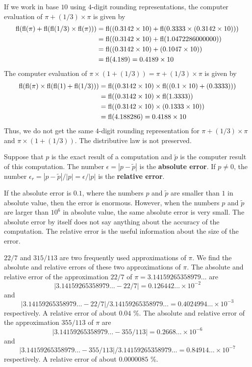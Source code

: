 \begin{itemize}
If we work in base $10$ using $4$-digit rounding representations, the
computer evaluation of $\pi + (1/3) \times \pi$ is given by
\begin{align*}
\operatorname{fl}(\operatorname{fl}(\pi)+\operatorname{fl}(\operatorname{fl}(1/3) \times \operatorname{fl}(\pi)))
&= \operatorname{fl}( (0.3142\times 10) + \operatorname{fl}( 0.3333 \times (0.3142 \times 10) )) \\
&= \operatorname{fl}( (0.3142\times 10) + \operatorname{fl}( 1.0472286000000  )) \\
&= \operatorname{fl}( (0.3142\times 10) + (0.1047 \times 10) ) \\
&= \operatorname{fl}( 4.189 ) = 0.4189 \times 10
\end{align*}
The computer evaluation of
$\pi \times (1 + (1/3))= \pi + (1/3)\times \pi$ is given by 
\begin{align*}
\operatorname{fl}( \operatorname{fl}(\pi) \times \operatorname{fl}( \operatorname{fl}(1) + \operatorname{fl}(1/3)))
&= \operatorname{fl}( (0.3142\times 10) \times \operatorname{fl}( (0.1\times 10) + (0.3333) )) \\
&= \operatorname{fl}( (0.3142\times 10) \times \operatorname{fl}(1.3333) ) \\
&= \operatorname{fl}( (0.3142\times 10) \times (0.1333\times 10) ) \\
&= \operatorname{fl}( 4.188286 ) = 0.4188 \times 10
\end{align*}
Thus, we do not get the same $4$-digit rounding representation for
$\pi + (1/3)\times \pi$ and $\pi \times (1 + (1/3))$.  The
distributive law is not preserved.
\end{itemize}

Suppose that $p$ is the exact result of a computation and $\tilde{p}$
is the computer result of this computation.  The number
$\epsilon = |p-\tilde{p}|$ is the
{\bfseries absolute error}.
If $p\neq 0$, the number
$\epsilon_r= |p-\tilde{p}|/|p|= \epsilon/|p|$
is the {\bfseries relative error}.

If the absolute error is $0.1$, where the numbers $p$ and $\tilde{p}$
are smaller than $1$ in absolute value, then the error is enormous.
However, when the numbers $p$ and $\tilde{p}$ are larger than $10^6$
in absolute value, the same absolute error is very small.  The
absolute error by itself does not say anything about the accuracy of
the computation.  The relative error is the useful information about
the size of the error.

\begin{egg}
$22/7$ and $315/113$ are two frequently used approximations of $\pi$.
We find the absolute and relative errors of these two approximations
of $\pi$.  The absolute and relative error of the approximation $22/7$ of
$\pi = 3.14159265358979\ldots$ are
\[
|3.14159265358979\ldots- 22/7| = 0.126442\ldots \times 10^{-2}
\]
and
\[
|3.14159265358979\ldots
- 22/7|/3.14159265358979\ldots = 0.4024994\ldots\times 10^{-3}
\]
respectively.  A relative error of about $0.04$ \%.  The absolute and
relative error of the approximation $355/113$ of $\pi$ are
\[
|3.14159265358979\ldots- 355/113| =
0.2668\ldots\times 10^{-6}
\]
and
\[
|3.14159265358979\ldots - 355/113|/3.14159265358979\ldots
= 0.84914\ldots\times10^{-7}
\]
respectively.  A relative error of about $0.0000085$ \%.
\end{egg}

